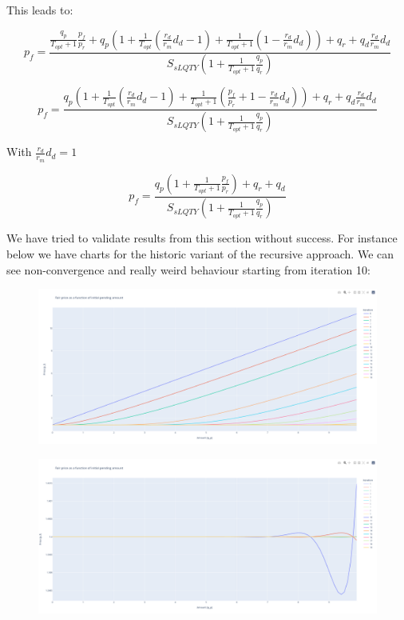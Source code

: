 \documentclass{article}
\begin{document}
This leads to:

\[
p_{f} = \frac{ \frac{q_{p}}{T_{opt}+1}\frac{p_{f}}{p_{r}}+q_{p} \left(1+\frac{1}{T_{opt}}\left(\frac{r_{d}}{r_{m}}d_{d}-1\right)+ \frac{1}{T_{opt}+1}\left( 1 - \frac{r_{d}}{r_{m}}d_{d} \right)\right)+q_{r}+q_{d}\frac{r_{d}}{r_{m}}d_{d}}{S_{sLQTY}\left(1+  \frac{1}{T_{opt}+1}\frac{q_{p}}{q_{r}}\right)}
\]

\begin{equation}
p_{f} = \frac{q_{p} \left(1 + \frac{1}{T_{opt}}\left(\frac{r_{d}}{r_{m}}d_{d}-1\right)+ \frac{1}{T_{opt}+1}\left(\frac{p_{f}}{p_{r}} + 1 - \frac{r_{d}}{r_{m}}d_{d} \right)\right)+q_{r}+q_{d}\frac{r_{d}}{r_{m}}d_{d}}{S_{sLQTY}\left(1+  \frac{1}{T_{opt}+1}\frac{q_{p}}{q_{r}}\right)}
\end{equation}

With $\frac{r_{d}}{r_{m}}d_{d}=1$

\begin{equation}
p_{f} = \frac{q_{p} \left( 1+   \frac{1}{T_{opt}+1}\frac{p_{f}}{p_{r}} \right)+q_{r}+q_{d}}{S_{sLQTY}\left(1+  \frac{1}{T_{opt}+1}\frac{q_{p}}{q_{r}}\right)}
\end{equation}

We have tried to validate results from this section without success. For instance below we have charts for the historic variant of the recursive approach. We can see non-convergence and really weird behaviour starting from iteration 10:

\begin{figure}
    \centering
    \includegraphics[width=0.5\linewidth]{./ChickenBonds_Whitepaper_recursive_price_1.png}
\end{figure}

\begin{figure}
    \centering
    \includegraphics[width=0.5\linewidth]{./ChickenBonds_Whitepaper_recursive_price_2.png}
\end{figure}
\end{document}
